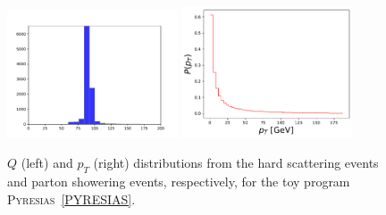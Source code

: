 \begin{figure}[ht]
  \centering
  \includegraphics[width=0.45\textwidth]{./res/gfx/Q-pyresias.pdf}
  \includegraphics[width=0.45\textwidth]{./res/gfx/pt-pyresias.pdf}
  \caption{$Q$ (left) and $p_T$ (right) distributions from the hard scattering events and parton showering events, respectively, for the toy program \textsc{Pyresias}~\ref{PYRESIAS}.}
  \label{fig:pyresias}
\end{figure}


